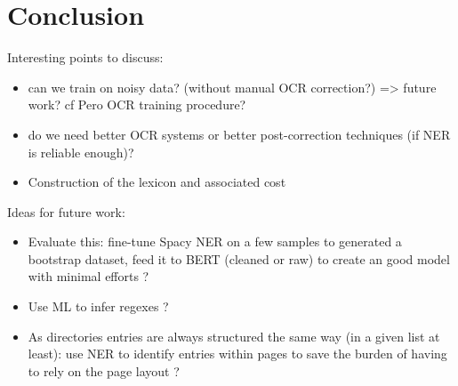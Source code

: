 \section{Conclusion}

Interesting points to discuss:
\begin{itemize}
    \item can we train on noisy data? (without manual OCR correction?) => future work? cf Pero OCR training procedure?
    \item do we need better OCR systems or better post-correction techniques (if NER is reliable enough)?
    \item Construction of the lexicon and associated cost
\end{itemize}

Ideas for future work:
\begin{itemize}
    \item Evaluate this: fine-tune Spacy NER on a few samples to generated a bootstrap dataset, feed it to BERT (cleaned or raw) to create an good model with minimal efforts ?
    \item Use ML to infer regexes ?
    \item As directories entries are always structured the same way (in a given list at least): use NER to identify entries within pages to save the burden of having to rely on the page layout ?
\end{itemize}